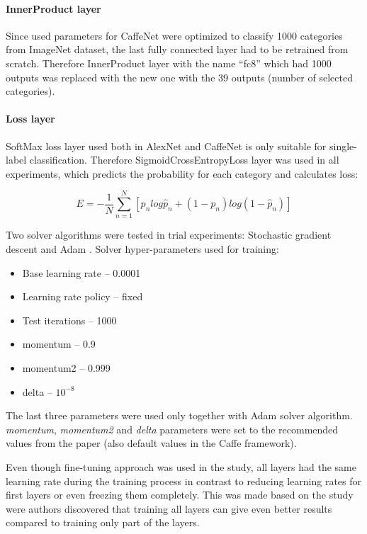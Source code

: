     \paragraph{InnerProduct layer}
    Since used parameters for CaffeNet were optimized to classify 1000 categories from ImageNet dataset, the last fully connected layer had to be retrained from scratch. Therefore InnerProduct layer with the name ``fc8'' which had 1000 outputs was replaced with the new one with the 39 outputs (number of selected categories).
    
    \paragraph{Loss layer}
    SoftMax loss layer used both in AlexNet and CaffeNet is only suitable for single-label classification. Therefore SigmoidCrossEntropyLoss layer was used in all experiments, which predicts the probability for each category and calculates loss:
    
    $$
    E = -\frac{1}{N} \sum_{n=1}^{N} [p_n log \hat p_n + (1 - p_n) log(1 - \hat p_n)]
    $$
    
    Two solver algorithms were tested in trial experiments: Stochastic gradient descent \cite{sgd} and Adam \cite{adam}. Solver hyper-parameters used for training:
    \begin{itemize}
        \item Base learning rate -- 0.0001
        \item Learning rate policy -- fixed
        \item Test iterations -- 1000
        \item momentum -- 0.9
        \item momentum2 -- 0.999
        \item delta -- $10^{-8}$
    \end{itemize}
    
    The last three parameters were used only together with Adam solver algorithm. \textit{momentum}, \textit{momentum2} and \textit{delta} parameters were set to the recommended values from the paper \cite{adam} (also default values in the Caffe framework).
    
    Even though fine-tuning approach was used in the study, all layers had the same learning rate during the training process in contrast to reducing learning rates for first layers or even freezing them completely. This was made based on the study \cite{Yosinski2014HowTransferable} were authors discovered that training all layers can give even better results compared to training only part of the layers.
    
